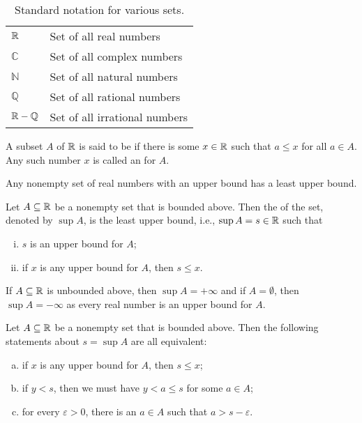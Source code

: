 \documentclass[11pt,a4paper]{article}
\begin{document}
\begin{table*}[ht]
    \begin{center}
    \begin{tabular}{l|l}
    $\mathbb{R}$ & Set of all real numbers\\ 
    $\mathbb{C}$ & Set of all complex numbers\\ 
    $\mathbb{N}$ & Set of all natural numbers\\ 
    $\mathbb{Q}$ & Set of all rational numbers\\ 
    $\mathbb{R}-\mathbb{Q}$ & Set of all irrational numbers\\ 
    \end{tabular}
    \caption{Standard notation for various sets.}
    \end{center}
\end{table*}
    
\begin{definition}
    A subset $A$ of $\mathbb{R}$ is said to be  if there is some $x\in \mathbb{R}$ such that $a\le x$ for all $a\in A$. Any such number $x$ is called an  for $A$. 
\end{definition}

\begin{axiom}
    Any nonempty set of real numbers with an upper bound has a least upper bound.
\end{axiom}

\begin{definition}\label{def:supremum}
    Let $A\subseteq \mathbb{R}$ be a nonempty set that is bounded above. Then the  of the set, denoted by $\sup A$, is the least upper bound, i.e., $\sup A = s\in \mathbb{R}$ such that
    \begin{enumerate}[(i)]
        \item $s$ is an upper bound for $A$;
        \item if $x$ is any upper bound for $A$, then $s\le x$.
    \end{enumerate}
\end{definition}

\begin{remark}
    If $A\subseteq \mathbb{R}$ is unbounded above, then $\sup A = +\infty$ and if $A = \emptyset$, then $\sup A = -\infty$ as every real number is an upper bound for $A$.
\end{remark}

\begin{proposition}\label{prop:char_sup}
    Let $A\subseteq \mathbb{R}$ be a nonempty set that is bounded above. Then the following statements about $s = \sup A$ are all equivalent:
    \begin{enumerate}[(a)]
        \item if $x$ is any upper bound for $A$, then $s\le x$;
        \item if $y<s$, then we must have $y<a\le s$ for some $a\in A$;
        \item for every $\varepsilon>0$, there is an $a\in A$ such that $a>s-\varepsilon$.
    \end{enumerate}
\end{proposition}
\end{document}
